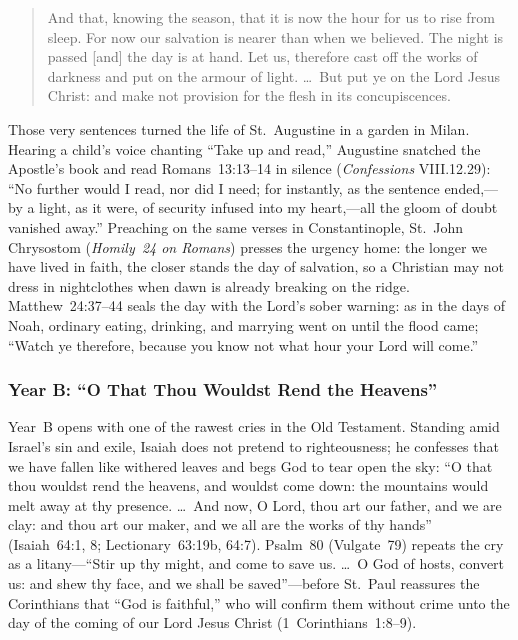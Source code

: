\begin{quote}
And that, knowing the season, that it is now the hour for us to rise from sleep. For now our salvation is nearer than when we believed. The night is passed [and] the day is at hand. Let us, therefore cast off the works of darkness and put on the armour of light. \dots\ But put ye on the Lord Jesus Christ: and make not provision for the flesh in its concupiscences.
\end{quote}

Those very sentences turned the life of St.~Augustine in a garden in Milan. Hearing a child's voice chanting ``Take up and read,'' Augustine snatched the Apostle's book and read Romans~13:13--14 in silence (\textit{Confessions} VIII.12.29): ``No further would I read, nor did I need; for instantly, as the sentence ended,---by a light, as it were, of security infused into my heart,---all the gloom of doubt vanished away.'' Preaching on the same verses in Constantinople, St.~John Chrysostom (\textit{Homily~24 on Romans}) presses the urgency home: the longer we have lived in faith, the closer stands the day of salvation, so a Christian may not dress in nightclothes when dawn is already breaking on the ridge. Matthew~24:37--44 seals the day with the Lord's sober warning: as in the days of Noah, ordinary eating, drinking, and marrying went on until the flood came; ``Watch ye therefore, because you know not what hour your Lord will come.''

\subsubsection{Year B: ``O That Thou Wouldst Rend the Heavens''}

Year~B opens with one of the rawest cries in the Old Testament. Standing amid Israel's sin and exile, Isaiah does not pretend to righteousness; he confesses that we have fallen like withered leaves and begs God to tear open the sky: ``O that thou wouldst rend the heavens, and wouldst come down: the mountains would melt away at thy presence. \dots\ And now, O Lord, thou art our father, and we are clay: and thou art our maker, and we all are the works of thy hands'' (Isaiah~64:1, 8; Lectionary~63:19b, 64:7). Psalm~80 (Vulgate~79) repeats the cry as a litany---``Stir up thy might, and come to save us. \dots\ O God of hosts, convert us: and shew thy face, and we shall be saved''---before St.~Paul reassures the Corinthians that ``God is faithful,'' who will confirm them without crime unto the day of the coming of our Lord Jesus Christ (1~Corinthians~1:8--9).


